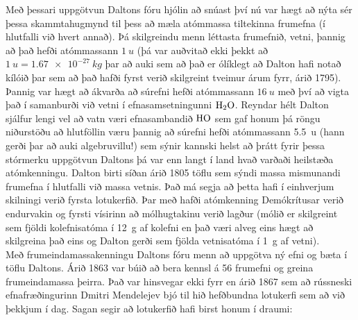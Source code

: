 Með þessari uppgötvun Daltons fóru hjólin að snúast því nú var hægt að nýta sér þessa skammtahugmynd til þess að mæla atómmassa tiltekinna frumefna (í hlutfalli við hvert annað). Þá skilgreindu menn léttasta frumefnið, vetni, þannig að það hefði atómmassann $\SI{1}{u}$ (þá var auðvitað ekki þekkt að $\SI{1}{u} = \SI{1.67e-27}{kg}$ þar að auki sem að það er ólíklegt að Dalton hafi notað kílóið þar sem að það hafði fyrst verið skilgreint tveimur árum fyrr, árið 1795). Þannig var hægt að ákvarða að súrefni hefði atómmassann $\SI{16}{u}$ með því að vigta það í samanburði við vetni í efnasamsetningunni $\ce{H2O}$. Reyndar hélt Dalton sjálfur lengi vel að vatn væri efnasambandið $\ce{HO}$ sem gaf honum þá röngu niðurstöðu að hlutföllin væru þannig að súrefni hefði atómmassann \SI{5.5}{u} (hann gerði þar að auki algebruvillu!) sem sýnir kannski helst að þrátt fyrir þessa stórmerku uppgötvun Daltons þá var enn langt í land hvað varðaði heilstæða atómkenningu. Dalton birti síðan árið 1805 töflu sem sýndi massa mismunandi frumefna í hlutfalli við massa vetnis. Það má segja að þetta hafi í einhverjum skilningi verið fyrsta lotukerfið. Þar með hafði atómkenning Demókrítusar verið endurvakin og fyrsti vísirinn að mólhugtakinu verið lagður (mólið er skilgreint sem fjöldi kolefnisatóma í \SI{12}{g} af kolefni en það væri alveg eins hægt að skilgreina það eins og Dalton gerði sem fjölda vetnisatóma í \SI{1}{g} af vetni).  \\

Með frumeindamassakenningu Daltons fóru menn að uppgötva ný efni og bæta í töflu Daltons. Árið 1863 var búið að bera kennsl á 56 frumefni og greina frumeindamassa þeirra. Það var hinsvegar ekki fyrr en árið 1867 sem að rússneski efnafræðingurinn Dmitri Mendelejev bjó til hið hefðbundna lotukerfi sem að við þekkjum í dag. Sagan segir að lotukerfið hafi birst honum í draumi: \\

\begin{tcolorbox}

 \\

\vspace{-0.3cm}
\end{tcolorbox}


